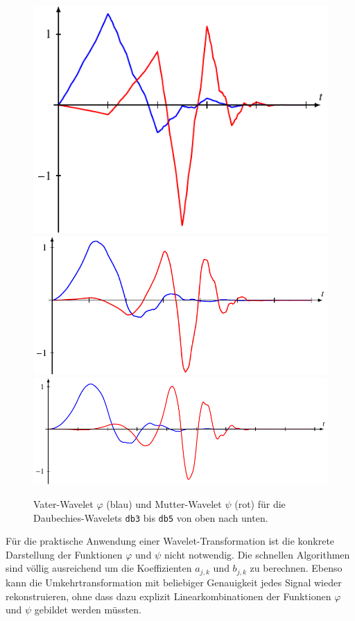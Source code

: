 \begin{figure}
\includegraphics{chapters/7-algo/images/db3.pdf}\\
\includegraphics{chapters/7-algo/images/db4.pdf}\\
\includegraphics{chapters/7-algo/images/db5.pdf}
\caption{Vater-Wavelet $\varphi$ (blau) und Mutter-Wavelet $\psi$
(rot) für die Daubechies-Wavelets \texttt{db3} bis \texttt{db5}
von oben nach unten.
\label{buch:algo:db2}}
\end{figure}%
Für die praktische Anwendung einer Wavelet-Transformation ist
die konkrete Darstellung der Funktionen $\varphi$ und $\psi$
nicht notwendig.
Die schnellen Algorithmen sind völlig ausreichend um die
Koeffizienten $a_{j,k}$ und $b_{j,k}$ zu berechnen.
Ebenso kann die Umkehrtransformation mit beliebiger Genauigkeit
jedes Signal wieder rekonstruieren, ohne dass dazu explizit 
Linearkombinationen der Funktionen $\varphi$ und $\psi$ gebildet
werden müssten.

